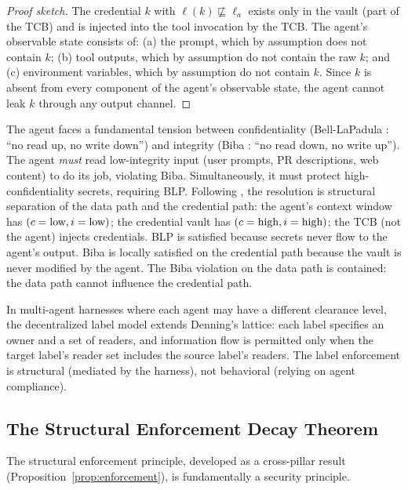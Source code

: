 \begin{proof}[Proof sketch]
The credential $k$ with $\ell(k) \not\sqsubseteq \ell_a$ exists only in the vault (part of the TCB) and is injected into the tool invocation by the TCB. The agent's observable state consists of: (a) the prompt, which by assumption does not contain $k$; (b) tool outputs, which by assumption do not contain the raw $k$; and (c) environment variables, which by assumption do not contain $k$. Since $k$ is absent from every component of the agent's observable state, the agent cannot leak $k$ through any output channel.
\end{proof}

\begin{remark}
The agent faces a fundamental tension between confidentiality (Bell-LaPadula \citep{bell1973secure}: ``no read up, no write down'') and integrity (Biba \citep{biba1977integrity}: ``no read down, no write up''). The agent \emph{must} read low-integrity input (user prompts, PR descriptions, web content) to do its job, violating Biba. Simultaneously, it must protect high-confidentiality secrets, requiring BLP. Following \citet{lipner1982nondiscretionary}, the resolution is structural separation of the data path and the credential path: the agent's context window has $(c = \textup{low}, i = \textup{low})$; the credential vault has $(c = \textup{high}, i = \textup{high})$; the TCB (not the agent) injects credentials. BLP is satisfied because secrets never flow to the agent's output. Biba is locally satisfied on the credential path because the vault is never modified by the agent. The Biba violation on the data path is contained: the data path cannot influence the credential path.
\end{remark}

In multi-agent harnesses where each agent may have a different clearance level, the decentralized label model \citep{myers1997decentralized} extends Denning's lattice: each label specifies an owner and a set of readers, and information flow is permitted only when the target label's reader set includes the source label's readers. The label enforcement is structural (mediated by the harness), not behavioral (relying on agent compliance).

\subsection{The Structural Enforcement Decay Theorem}

The structural enforcement principle, developed as a cross-pillar result (Proposition~\ref{prop:enforcement}), is fundamentally a security principle.

